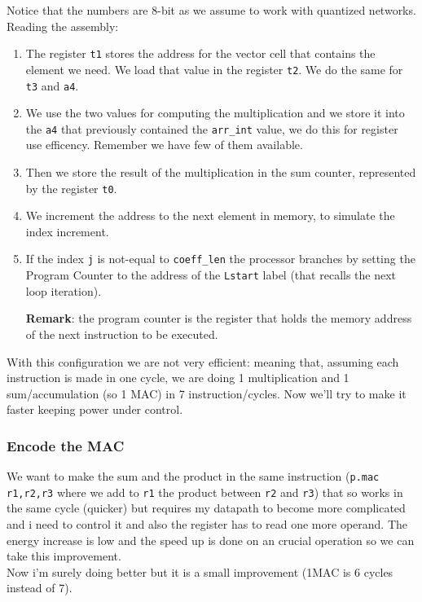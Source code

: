 Notice that the numbers are 8-bit as we assume to work with quantized networks. Reading the assembly:
\begin{enumerate}
    \item The register \verb|t1| stores the address for the vector cell that contains the element we need. We load that value in the register \verb|t2|. We do the same for \verb|t3| and \verb|a4|. 
    \item We use the two values for computing the multiplication and we store it into the \verb|a4| that previously contained the \verb|arr_int| value, we do this for register use efficency. Remember we have few of them available.
    \item Then we store the result of the multiplication in the sum counter, represented by the register \verb|t0|. 
    \item We increment the address to the next element in memory, to simulate the index increment.
    \item If the index \verb|j| is not-equal to \verb|coeff_len| the processor branches by setting the Program Counter to the address of the \verb|Lstart| label (that recalls the next loop iteration). 
    \begin{mybox}
        \textbf{Remark}: the program counter is the register that holds the memory address of the next instruction to be executed.
    \end{mybox}
\end{enumerate}

With this configuration we are not very efficient: meaning that, assuming each instruction is made in one cycle, we are doing 1 multiplication and 1 sum/accumulation (so 1 MAC) in 7 instruction/cycles. Now we'll try to make it faster keeping power under control.

\subsubsection{Encode the MAC}
We want to make the sum and the product in the same instruction (\verb|p.mac r1,r2,r3| where we add to \verb|r1| the product between \verb|r2| and \verb|r3|) that so works in the same cycle (quicker) but requires my datapath to become more complicated and i need to control it and also the register has to read one more operand. The energy increase is low and the speed up is done on an crucial operation so we can take this improvement.\\

Now i'm surely doing better but it is a small improvement (1MAC is 6 cycles instead of 7).

